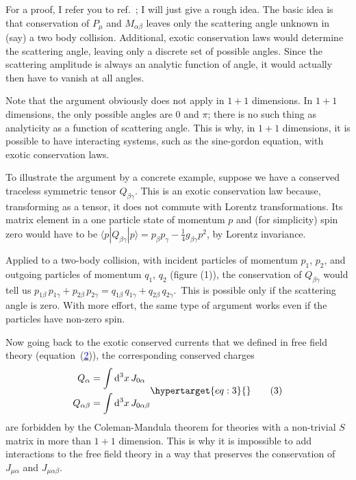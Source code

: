 \documentclass[11pt,a4paper]{article}
\newcommand{\eqtarget}[1]{\hypertarget{eq:#1}{\mathstrut}\tag{#1}}
\newcommand{\eqnref}[1]{(\hyperlink{eq:#1}{\textcolor{blue}{#1}})}
\newcommand{\asteriskfootnotemark}{\footnotemark[1]}
\newcommand{\dd}{\mathop{}\!\mathrm{d}}
\begin{document}
For a proof, I refer you to ref.~\cite{ref3}; I will just give a
rough idea. The basic idea is that conservation of $P_\mu$ and $M_{\alpha\beta}$
leaves only the scattering angle unknown in (say) a two body
collision. Additional, exotic conservation laws would determine the
scattering angle, leaving only a discrete set of possible angles.
Since the scattering amplitude is always an analytic function of
angle, it would actually then have to vanish at all angles.

Note that the argument obviously does not apply in $1+1$
dimensions. In $1+1$ dimensions, the only possible angles are $0$ and $\pi$;
there is no such thing as analyticity as a function of scattering
angle. This is why, in $1+1$ dimensions, it is possible to have
interacting systems, such as the sine-gordon equation, with exotic
conservation laws.

To illustrate the argument by a concrete example, suppose we
have a conserved traceless symmetric tensor $Q_{\beta\gamma}$. This is an exotic
conservation law because, transforming as a tensor, it does not
commute with Lorentz transformations. Its matrix element in a one
particle state of momentum $p$ and (for simplicity) spin zero would
have to be $\langle p| Q_{\beta\gamma} |p\rangle = p_\beta p_\gamma - \frac{1}{4}g_{\beta\gamma} p^2$, by Lorentz invariance.

Applied to a two-body collision, with incident particles of momentum
$p_1$, $p_2$, and outgoing particles of momentum $q_1$, $q_2$ (figure (1)), the
conservation of $Q_{\beta\gamma}$ would tell us $p_{1\beta}\, p_{1\gamma} + p_{2\beta}\, p_{2\gamma} = q_{1\beta}\, q_{1\gamma} +
q_{2\beta}\, q_{2\gamma}$.\asteriskfootnotemark \, This is possible only if 
the scattering angle is zero. With more effort, the same type of argument works 
even if the particles have non-zero spin.

Now going back to the exotic conserved currents that we defined
in free field theory (equation~\eqnref{2}), the corresponding conserved
charges
\begin{equation}
\begin{aligned}
Q_\alpha &= \int \dd^3x\, J_{0\alpha} \\
Q_{\alpha\beta} &= \int \dd^3x\, J_{0\alpha\beta}
\end{aligned}
\eqtarget{3}
\end{equation}
are forbidden by the Coleman-Mandula theorem for theories with a
non-trivial $S$ matrix in more than $1+1$ dimension. This is why it is
impossible to add interactions to
the free field theory in a way that
preserves the conservation of $J_{\mu\alpha}$
and $J_{\mu\alpha\beta}$.
\end{document}
